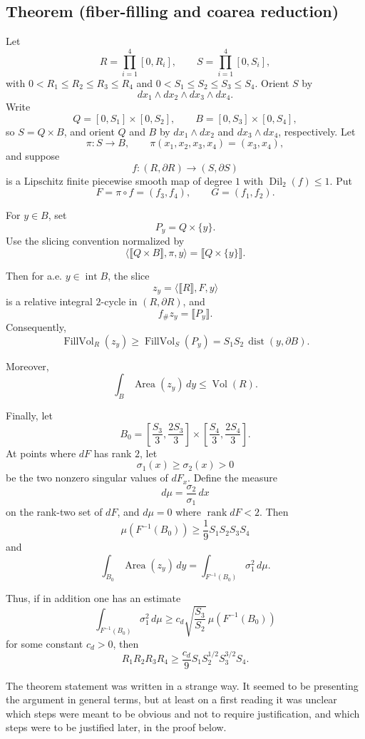 \documentclass[12pt]{article}
\newcommand{\review}[1]{\begin{reviewbox}#1\end{reviewbox}}
\begin{document}
\date{}


\subsection*{Theorem (fiber-filling and coarea reduction)}

Let
\[
R=\prod_{i=1}^4[0,R_i],\qquad S=\prod_{i=1}^4[0,S_i],
\]
with \(0<R_1\le R_2\le R_3\le R_4\) and \(0<S_1\le S_2\le S_3\le S_4\). Orient \(S\) by
\[
dx_1\wedge dx_2\wedge dx_3\wedge dx_4.
\]
Write
\[
Q=[0,S_1]\times[0,S_2],\qquad B=[0,S_3]\times[0,S_4],
\]
so \(S=Q\times B\), and orient \(Q\) and \(B\) by \(dx_1\wedge dx_2\) and \(dx_3\wedge dx_4\), respectively. Let
\[
\pi:S\to B,\qquad \pi(x_1,x_2,x_3,x_4)=(x_3,x_4),
\]
and suppose
\[
f:(R,\partial R)\to(S,\partial S)
\]
is a Lipschitz finite piecewise smooth map of degree \(1\) with \(\operatorname{Dil}_2(f)\le 1\). Put
\[
F=\pi\circ f=(f_3,f_4),\qquad G=(f_1,f_2).
\]

For \(y\in B\), set
\[
P_y=Q\times\{y\}.
\]
Use the slicing convention normalized by
\[
\langle \llbracket Q\times B\rrbracket,\pi,y\rangle
=
\llbracket Q\times\{y\}\rrbracket .
\]

Then for a.e. \(y\in \operatorname{int}B\), the slice
\[
z_y=\langle \llbracket R\rrbracket,F,y\rangle
\]
is a relative integral \(2\)-cycle in \((R,\partial R)\), and
\[
f_\# z_y=\llbracket P_y\rrbracket .
\]
Consequently,
\[
\operatorname{FillVol}_R(z_y)\ge \operatorname{FillVol}_S(P_y)
=S_1S_2\,\operatorname{dist}(y,\partial B).
\]

Moreover,
\[
\int_B \operatorname{Area}(z_y)\,dy\le \operatorname{Vol}(R).
\]

Finally, let
\[
B_0=\left[\frac{S_3}{3},\frac{2S_3}{3}\right]\times
\left[\frac{S_4}{3},\frac{2S_4}{3}\right].
\]
At points where \(dF\) has rank \(2\), let
\[
\sigma_1(x)\ge \sigma_2(x)>0
\]
be the two nonzero singular values of \(dF_x\). Define the measure
\[
d\mu=\frac{\sigma_2}{\sigma_1}\,dx
\]
on the rank-two set of \(dF\), and \(d\mu=0\) where \(\operatorname{rank}dF<2\). Then
\[
\mu(F^{-1}(B_0))\ge \frac19 S_1S_2S_3S_4
\]
and
\[
\int_{B_0}\operatorname{Area}(z_y)\,dy
=
\int_{F^{-1}(B_0)}\sigma_1^2\,d\mu.
\]

Thus, if in addition one has an estimate
\[
\int_{F^{-1}(B_0)}\sigma_1^2\,d\mu
\ge
c_d\sqrt{\frac{S_3}{S_2}}\,
\mu(F^{-1}(B_0))
\]
for some constant \(c_d>0\), then
\[
R_1R_2R_3R_4
\ge
\frac{c_d}{9}S_1S_2^{1/2}S_3^{3/2}S_4.
\]
\review{The theorem statement was written in a strange way.  It seemed to be presenting the argument in general terms, but at least on a first reading it was unclear which steps were meant to be obvious and not to require justification, and which steps were to be justified later, in the proof below.}
\end{document}

